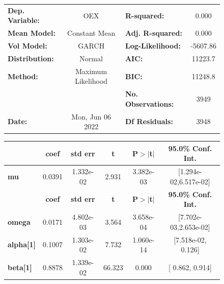 \documentclass[a4paper, oneside]{discothesis}
\begin{document}
\begin{figure}
\begin{multicols}{2}
{  
\begin{center}
\begin{tabular}{lclc}
\toprule
\textbf{Dep. Variable:} &         OEX        & \textbf{  R-squared:         } &     0.000   \\
\textbf{Mean Model:}    &   Constant Mean    & \textbf{  Adj. R-squared:    } &     0.000   \\
\textbf{Vol Model:}     &       GARCH        & \textbf{  Log-Likelihood:    } &   -5607.86  \\
\textbf{Distribution:}  &       Normal       & \textbf{  AIC:               } &    11223.7  \\
\textbf{Method:}        & Maximum Likelihood & \textbf{  BIC:               } &    11248.8  \\
\textbf{}               &                    & \textbf{  No. Observations:  } &    3949     \\
\textbf{Date:}          &  Mon, Jun 06 2022  & \textbf{  Df Residuals:      } &    3948     \\
\bottomrule
\end{tabular}
\begin{tabular}{lccccc}
            & \textbf{coef} & \textbf{std err} & \textbf{t} & \textbf{P$> |$t$|$} & \textbf{95.0\% Conf. Int.}  \\
\midrule
\textbf{mu} &       0.0391  &    1.332e-02     &     2.931  &      3.382e-03       &   [1.294e-02,6.517e-02]     \\
                  & \textbf{coef} & \textbf{std err} & \textbf{t} & \textbf{P$> |$t$|$} & \textbf{95.0\% Conf. Int.}  \\
\midrule
\textbf{omega}    &       0.0171  &    4.802e-03     &     3.564  &      3.658e-04       &   [7.702e-03,2.653e-02]     \\
\textbf{alpha[1]} &       0.1007  &    1.303e-02     &     7.732  &      1.060e-14       &    [7.518e-02,  0.126]      \\
\textbf{beta[1]}  &       0.8878  &    1.339e-02     &    66.323  &        0.000         &     [  0.862,  0.914]       \\
\bottomrule
\end{tabular}
\end{center}

}
\end{multicols}
\end{figure}
\end{document}
